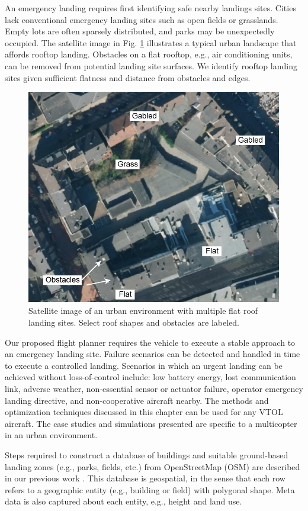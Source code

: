 An emergency landing requires first identifying safe nearby landings sites.  Cities lack conventional emergency landing sites such as open fields or grasslands. Empty lots are often sparsely distributed, and parks may be unexpectedly occupied.  The satellite image in Fig. \ref{fig:ch5_challenge_urban} illustrates a typical urban landscape that affords rooftop landing. Obstacles on a flat rooftop, e.g., air conditioning units, can be removed from potential landing site surfaces. We identify rooftop landing sites given sufficient flatness and distance from obstacles and edges. 

\begin{figure}[ht]
    \centering
    \includegraphics[clip, trim=0.0cm 0cm 0cm 0cm, width=0.45\linewidth]{chapter_5_mapping/imgs/challenge_urban-Page-2.jpg}
    \caption[Satellite image of an urban environment]{Satellite image of an urban environment with multiple flat roof landing sites. Select roof shapes and obstacles are labeled.}
    \label{fig:ch5_challenge_urban}
\end{figure}

Our proposed flight planner requires the vehicle to execute a stable approach to an emergency landing site.  Failure scenarios can be detected and handled in time to execute a controlled landing. Scenarios in which an urgent landing can be achieved without loss-of-control include: low battery energy, lost communication link, adverse weather, non-essential sensor or actuator failure, operator emergency landing directive, and non-cooperative aircraft nearby.  The methods and optimization techniques discussed in this chapter can be used for any VTOL aircraft. The case studies and simulations presented are specific to a multicopter in an urban environment.

Steps required to construct a database of buildings and suitable ground-based landing zones (e.g., parks, fields, etc.) from  OpenStreetMap (OSM) are described in our previous work \cite{castagno_comprehensive_2018}.  This database is geospatial, in the sense that each row refers to a geographic entity (e.g., building or field) with polygonal shape. Meta data is also captured about each entity, e.g., height and land use. 

